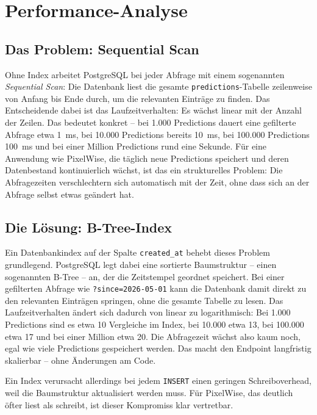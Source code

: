 \documentclass[12pt, a4paper]{article}
\begin{document}
\section{Performance-Analyse}

\subsection{Das Problem: Sequential Scan}

Ohne Index arbeitet PostgreSQL bei jeder Abfrage mit einem sogenannten
\emph{Sequential Scan}: Die Datenbank liest die gesamte
\texttt{predictions}-Tabelle zeilenweise von Anfang bis Ende durch, um die
relevanten Einträge zu finden. Das Entscheidende dabei ist das
Laufzeitverhalten: Es wächst linear mit der Anzahl der Zeilen. Das bedeutet
konkret -- bei 1.000 Predictions dauert eine gefilterte Abfrage etwa 1~ms,
bei 10.000 Predictions bereits 10~ms, bei 100.000 Predictions 100~ms und
bei einer Million Predictions rund eine Sekunde. Für eine Anwendung wie
PixelWise, die täglich neue Predictions speichert und deren Datenbestand
kontinuierlich wächst, ist das ein strukturelles Problem: Die Abfragezeiten
verschlechtern sich automatisch mit der Zeit, ohne dass sich an der Abfrage
selbst etwas geändert hat.

\subsection{Die Lösung: B-Tree-Index}

Ein Datenbankindex auf der Spalte \texttt{created\_at} behebt dieses Problem
grundlegend. PostgreSQL legt dabei eine sortierte Baumstruktur -- einen
sogenannten B-Tree -- an, der die Zeitstempel geordnet speichert. Bei einer
gefilterten Abfrage wie \texttt{?since=2026-05-01} kann die Datenbank damit
direkt zu den relevanten Einträgen springen, ohne die gesamte Tabelle zu
lesen. Das Laufzeitverhalten ändert sich dadurch von linear zu logarithmisch:
Bei 1.000 Predictions sind es etwa 10 Vergleiche im Index, bei 10.000 etwa
13, bei 100.000 etwa 17 und bei einer Million etwa 20. Die Abfragezeit wächst
also kaum noch, egal wie viele Predictions gespeichert werden. Das macht den
Endpoint langfristig skalierbar -- ohne Änderungen am Code.

Ein Index verursacht allerdings bei jedem \texttt{INSERT} einen geringen
Schreiboverhead, weil die Baumstruktur aktualisiert werden muss. Für
PixelWise, das deutlich öfter liest als schreibt, ist dieser Kompromiss
klar vertretbar.
\end{document}
